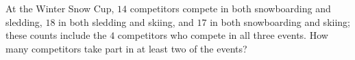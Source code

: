 At the Winter Snow Cup, $14$ competitors compete in both snowboarding and sledding, $18$ in both sledding and skiing, and $17$ in both snowboarding and skiing; these counts include the $4$ competitors who compete in all three events. How many competitors take part in at least two of the events?
